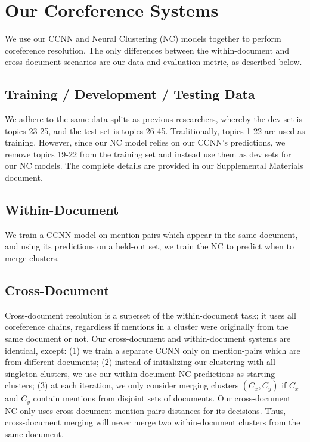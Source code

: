 \documentclass[11pt,a4paper]{article}
\begin{document}
\section{Our Coreference Systems}
\label{sec:coreference}

We use our CCNN and Neural Clustering (NC) models together to perform coreference resolution. The only differences between the within-document and cross-document scenarios are our data and evaluation metric, as described below.

\subsection{Training / Development / Testing Data}
We adhere to the same data splits as previous researchers, whereby the dev set is topics 23-25, and the test set is topics 26-45.  Traditionally, topics 1-22 are used as training.  However, since our NC model relies on our CCNN's predictions, we remove topics 19-22 from the training set and instead use them as dev sets for our NC models.  The complete details are provided in our Supplemental Materials document.

\subsection{Within-Document}
We train a CCNN model on mention-pairs which appear in the same document, and using its predictions on a held-out set, we train the NC to predict when to merge clusters.

\subsection{Cross-Document}
Cross-document resolution is a superset of the within-document task; it uses all coreference chains, regardless if mentions in a cluster were originally from the same document or not.  Our cross-document and within-document systems are identical, except: (1) we train a separate CCNN only on mention-pairs which are from different documents; (2) instead of initializing our clustering with all singleton clusters, we use our within-document NC predictions as starting clusters; (3) at each iteration, we only consider merging clusters $(C_x,C_y)$ if $C_x$ and $C_y$ contain mentions from disjoint sets of documents.  Our cross-document NC only uses cross-document mention pairs distances for its decisions.  Thus, cross-document merging will never merge two within-document clusters from the same document.
\end{document}
